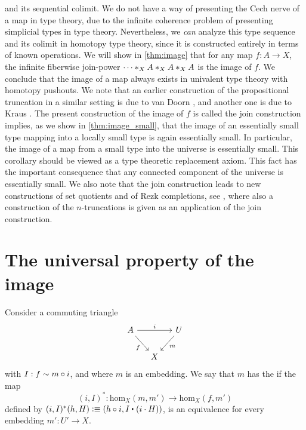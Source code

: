 and its sequential colimit. We do not have a way of presenting the Cech nerve of a map in type theory, due to the infinite coherence problem of presenting simplicial types in type theory. Nevertheless, we \emph{can} analyze this type sequence and its colimit in homotopy type theory, since it is constructed entirely in terms of known operations. We will show in \cref{thm:image} that for any map $f:A\to X$, the infinite fiberwise join-power $\join[X]{\cdots}{\join[X]{A}{\join[X]{A}{A}}}$ is the image of $f$. We conclude that the image of a map always exists in univalent type theory with homotopy pushouts. We note that an earlier construction of the propositional truncation in a similar setting is due to van Doorn \cite{vanDoorn2016}, and another one is due to Kraus \cite{Kraus2016}. The present construction of the image of $f$ is called the join construction implies, as we show in \cref{thm:image_small}, that the image of an essentially small type mapping into a locally small type is again essentially small. In particular, the image of a map from a small type into the universe is essentially small. This corollary should be viewed as a type theoretic replacement axiom. This fact has the important consequence that any connected component of the universe is essentially small. We also note that the join construction leads to new constructions of set quotients and of Rezk completions, see \cite{joinconstruction}, where also a construction of the $n$-truncations is given as an application of the join construction.

\section{The universal property of the image}
\begin{defn}\label{defn:image_up}
Consider a commuting triangle
\begin{equation*}
\begin{tikzcd}[column sep=small]
A \arrow[rr,"i"] \arrow[dr,swap,"f"] & & U \arrow[dl,"m"] \\
& X
\end{tikzcd}
\end{equation*}
with $I:f\htpy m\circ i$, and where $m$ is an embedding.
We say that $m$ has the  if the map
\begin{equation*}
(i,I)^\ast : \mathrm{hom}_X(m,m')\to\mathrm{hom}_X(f,m')
\end{equation*}
defined by $(i,I)^\ast(h,H)\defeq (h\circ i,\ct{I}{(i\cdot H)})$,
is an equivalence for every embedding $m':U'\to X$. 
\end{defn}

